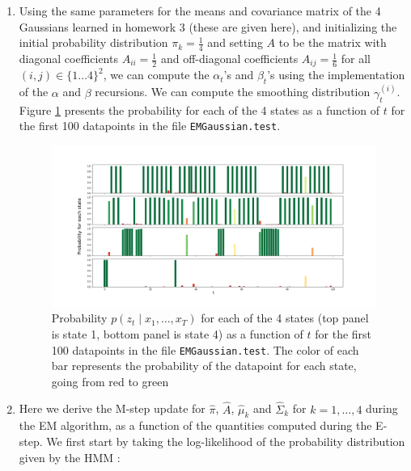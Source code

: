 \documentclass[11pt]{article}
\begin{document}
\begin{enumerate}
\item Using the same parameters for the means and covariance matrix of the 4 Gaussians learned in homework 3 (these are given here), and initializing the initial probability distribution $\pi_k = \frac{1}{4}$ and setting $A$ to be the matrix with diagonal coefficients $A_{ii}=\frac{1}{2}$ and off-diagonal coefficients $A_{ij} = \frac{1}{6}$ for all $(i,j) \in \{1 \dots 4\}^2$, we can compute the $\alpha_t$'s and $\beta_t$'s using the implementation of the $\alpha$ and $\beta$ recursions. We can compute the smoothing distribution $\gamma_t ^{(i)}$. Figure \ref{fig:prob_alphabeta} presents the probability for each of the 4 states as a function of $t$ for the first 100 datapoints in the file \texttt{EMGaussian.test}.

\begin{figure}[htbp]
\begin{center}
\includegraphics[width=\textwidth]{figures/fake_param_inference.png}
\caption{Probability $p(z_t\mid x_1,\dots , x_T)$ for each of the 4 states (top panel is state 1, bottom panel is state 4) as a function of $t$ for the first 100 datapoints in the file \texttt{EMGaussian.test}. The color of each bar represents the probability of the datapoint for each state, going from red to green}
\label{fig:prob_alphabeta}
\end{center}
\end{figure}

\item Here we derive the M-step update for $\hat{\pi}$, $\hat{A}$, $\hat{\mu}_k$ and $\hat{\Sigma}_k$ for $k=1, \dots, 4$ during the EM algorithm, as a function of the quantities computed during the E-step. We first start by taking the log-likelihood of the probability distribution given by the HMM :



\end{enumerate}
\end{document}
